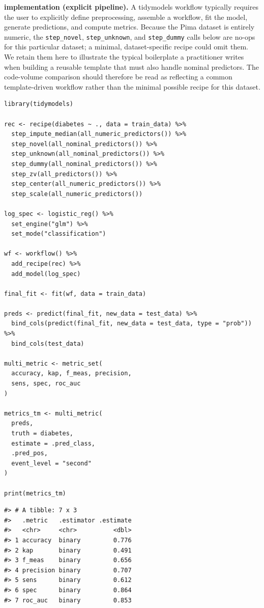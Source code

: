 \textbf{ implementation (explicit pipeline).}
A tidymodels workflow typically requires the user to explicitly define preprocessing, assemble a workflow, fit the model, generate predictions, and compute metrics. Because the Pima dataset is entirely numeric, the \texttt{step\_novel}, \texttt{step\_unknown}, and \texttt{step\_dummy} calls below are no-ops for this particular dataset; a minimal, dataset-specific recipe could omit them. We retain them here to illustrate the typical boilerplate a practitioner writes when building a reusable template that must also handle nominal predictors. The code-volume comparison should therefore be read as reflecting a common template-driven workflow rather than the minimal possible recipe for this dataset.

\begin{verbatim}
library(tidymodels)

rec <- recipe(diabetes ~ ., data = train_data) %>%
  step_impute_median(all_numeric_predictors()) %>%
  step_novel(all_nominal_predictors()) %>%
  step_unknown(all_nominal_predictors()) %>%
  step_dummy(all_nominal_predictors()) %>%
  step_zv(all_predictors()) %>%
  step_center(all_numeric_predictors()) %>%
  step_scale(all_numeric_predictors())

log_spec <- logistic_reg() %>%
  set_engine("glm") %>%
  set_mode("classification")

wf <- workflow() %>%
  add_recipe(rec) %>%
  add_model(log_spec)

final_fit <- fit(wf, data = train_data)

preds <- predict(final_fit, new_data = test_data) %>%
  bind_cols(predict(final_fit, new_data = test_data, type = "prob")) %>%
  bind_cols(test_data)

multi_metric <- metric_set(
  accuracy, kap, f_meas, precision, 
  sens, spec, roc_auc
)

metrics_tm <- multi_metric(
  preds,
  truth = diabetes,
  estimate = .pred_class,
  .pred_pos,
  event_level = "second"
)

print(metrics_tm)
\end{verbatim}

\begin{verbatim}
#> # A tibble: 7 x 3
#>   .metric   .estimator .estimate
#>   <chr>     <chr>          <dbl>
#> 1 accuracy  binary         0.776
#> 2 kap       binary         0.491
#> 3 f_meas    binary         0.656
#> 4 precision binary         0.707
#> 5 sens      binary         0.612
#> 6 spec      binary         0.864
#> 7 roc_auc   binary         0.853
\end{verbatim}

